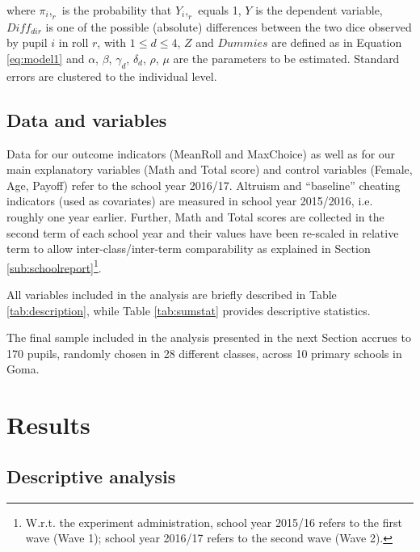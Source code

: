 \documentclass[authoryear, preprint, review, 12pt]{elsarticle}
\begin{document}
where
$\pi_i,_r$ is the probability that $Y_i,_r$ equals 1, $Y$ is the dependent variable, $Diff_{dir}$ is one of the possible (absolute) differences between the two dice observed by pupil $i$ in roll $r$, with $1 \le d \le 4$, $Z$ and $Dummies$ are defined as in Equation \ref{eq:model1} and $\alpha$, $\beta$, $\gamma_{d}$, $\delta_{d}$, $\rho$, $\mu$ are the parameters to be estimated. Standard errors are clustered to the individual level.

\subsection{Data and variables}
\label{subsec: Data and variables}
Data for our outcome indicators (MeanRoll and MaxChoice) as well as for our main explanatory variables (Math and Total score) and control variables (Female, Age, Payoff) refer to the school year 2016/17. Altruism and \enquote{baseline} cheating indicators (used as covariates) are measured in school year 2015/2016, i.e. roughly one year earlier. Further, Math and Total scores are collected in the second term of each school year and their values have been re-scaled in relative term to allow inter-class/inter-term comparability as explained in Section \ref{sub:schoolreport}\footnote {W.r.t. the experiment administration, school year 2015/16 refers to the first wave (Wave 1); school year 2016/17 refers to the second wave (Wave 2).}.

All variables included in the analysis are briefly described in Table \ref{tab:description}, while Table \ref{tab:sumstat} provides descriptive statistics. 

The final sample included in the analysis presented in the next Section accrues to 170 pupils, randomly chosen in 28 different classes, across 10 primary schools in Goma.





\section{Results}
\label{sec:results}

\subsection{Descriptive analysis}
\label{subsec:Descriptive}
\end{document}
